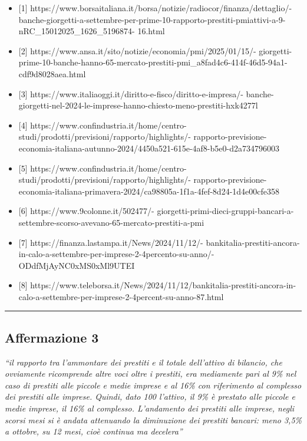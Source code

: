 \documentclass[
  letterpaper,
  DIV=11,
  numbers=noendperiod]{scrartcl}
\providecommand{\tightlist}{%
  \setlength{\itemsep}{0pt}\setlength{\parskip}{0pt}}\usepackage{longtable,booktabs,array}
\begin{document}
\begin{itemize}
\tightlist
\item
  {[}1{]}
  https://www.borsaitaliana.it/borsa/notizie/radiocor/finanza/dettaglio/-
  banche-giorgetti-a-settembre-per-prime-10-rapporto-prestiti-pmiattivi-a-9-nRC\_15012025\_1626\_5196874-
  16.html
\item
  {[}2{]} https://www.ansa.it/sito/notizie/economia/pmi/2025/01/15/-
  giorgetti-prime-10-banche-hanno-65-mercato-prestiti-pmi\_a8fad4c6-414f-46d5-94a1-cdf9d8028aea.html
\item
  {[}3{]} https://www.italiaoggi.it/diritto-e-fisco/diritto-e-impresa/-
  banche-giorgetti-nel-2024-le-imprese-hanno-chiesto-meno-prestiti-hxk4277l
\item
  {[}4{]}
  https://www.confindustria.it/home/centro-studi/prodotti/previsioni/rapporto/highlights/-
  rapporto-previsione-economia-italiana-autunno-2024/4450a521-615e-4af8-b5e0-d2a734796003
\item
  {[}5{]}
  https://www.confindustria.it/home/centro-studi/prodotti/previsioni/rapporto/highlights/-
  rapporto-previsione-economia-italiana-primavera-2024/ca98805a-1f1a-4fef-8d24-1d4e00cfe358
\item
  {[}6{]} https://www.9colonne.it/502477/-
  giorgetti-primi-dieci-gruppi-bancari-a-settembre-scorso-avevano-65-mercato-prestiti-a-pmi
\item
  {[}7{]} https://finanza.lastampa.it/News/2024/11/12/-
  bankitalia-prestiti-ancora-in-calo-a-settembre-per-imprese-2-4percento-su-anno/-
  ODdfMjAyNC0xMS0xMl9UTEI
\item
  {[}8{]}
  https://www.teleborsa.it/News/2024/11/12/bankitalia-prestiti-ancora-in-calo-a-settembre-per-imprese-2-4percent-su-anno-87.html
\end{itemize}

\begin{center}\rule{0.5\linewidth}{0.5pt}\end{center}

\subsection{Affermazione 3}\label{affermazione-3}

\emph{``il rapporto tra l'ammontare dei prestiti e il totale dell'attivo
di bilancio, che ovviamente ricomprende altre voci oltre i prestiti, era
mediamente pari al 9\% nel caso di prestiti alle piccole e medie imprese
e al 16\% con riferimento al complesso dei prestiti alle imprese.
Quindi, dato 100 l'attivo, il 9\% è prestato alle piccole e medie
imprese, il 16\% al complesso. L'andamento dei prestiti alle imprese,
negli scorsi mesi si è andata attenuando la diminuzione dei prestiti
bancari: meno 3,5\% a ottobre, su 12 mesi, cioè continua ma decelera''}
\end{document}
